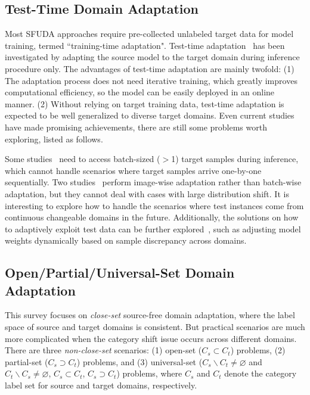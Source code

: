 \documentclass[10pt,journal,compsoc]{IEEEtran}
\begin{document}
\subsection{Test-Time Domain Adaptation}
Most SFUDA approaches require pre-collected unlabeled target data for model training, termed ``training-time adaptation".
Test-time adaptation~\cite{wang2020tent, yazdanpanah2022visual, karani2021test, boudiaf2022parameter, iwasawa2021test} has been investigated by adapting the source model to the target domain during inference procedure only.
The advantages of test-time adaptation are mainly twofold: 
(1) The adaptation process does not need iterative training, which greatly improves computational efficiency, so the model can be easily deployed in an online manner.
(2) Without relying on target training data, test-time adaptation is expected to be well generalized to diverse target domains.
Even current studies have made promising achievements, there are still some problems worth exploring, listed as follows. 

Some studies~\cite{wang2020tent, ma2022test, you2021test} need to access batch-sized ($>$1) target samples during inference, which cannot handle scenarios where target samples arrive one-by-one sequentially.
Two studies~\cite{he2021autoencoder, he2020self} perform image-wise adaptation rather than batch-wise adaptation, but they cannot deal with cases with large distribution shift.
It is interesting to explore how to handle the scenarios where test instances come from continuous changeable domains in the future.
Additionally, the solutions on how to adaptively exploit test data can be further explored~\cite{yang2022dltta}, such as adjusting model weights dynamically based on sample discrepancy across domains.


\subsection{Open/Partial/Universal-Set Domain Adaptation}
This survey focuses on \emph{close-set} source-free domain adaptation, where the label space of source and target domains is consistent.
But practical scenarios are much more complicated when the category shift issue occurs across different domains.
There are three \emph{non-close-set} scenarios: (1) open-set ($C_s\subset C_t$) problems, (2) partial-set ($C_s \supset C_t$) problems, and (3) universal-set ($C_s \backslash C_t \neq \varnothing$ and $C_t \backslash C_s \neq \varnothing$, $C_s\subset C_t$, $C_s \supset C_t$) problems, where $C_s$ and $C_t$ denote the category label set for source and target domains, respectively.
\end{document}
